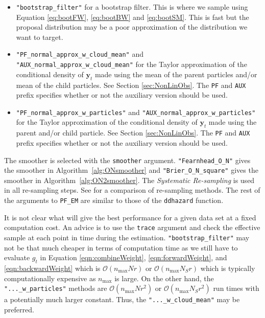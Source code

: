 \documentclass[notitlepage]{article}
\renewcommand{\vec}[1]{\bm{#1}}
\newcommand{\Lparen}[1]{\left( #1\right)}
\newcommand{\bigO}[1]{\mathcal{O}\Lparen{#1}}
\newcommand{\dimRng}{r}
\newcommand{\nPart}{N}
\newcommand{\nMax}{n_{\text{max}}}
\begin{document}
\begin{itemize}
	\item \texttt{"bootstrap\_filter"} for a bootstrap filter. This is where we sample using 
	Equation \eqref{eq:bootFW}, \eqref{eq:bootBW} and \eqref{eq:bootSM}. This is fast but the proposal 
	distribution may be a poor approximation of the distribution we want to target.
	\item \texttt{"PF\_normal\_approx\_w\_cloud\_mean"} and \texttt{"AUX\_normal\_approx\_w\_cloud\_mean"} for 
	the Taylor approximation of the conditional density of $\vec{y}_t$ made using the mean of the parent 
	particles and/or mean of the child particles. See Section \ref{sec:NonLinObs}. 
	The \texttt{PF} and \texttt{AUX} prefix specifies whether or not the auxiliary version 
	should be used.
	\item \texttt{"PF\_normal\_approx\_w\_particles"} and 
	 \texttt{"AUX\_normal\_approx\_w\_particles"} for the Taylor approximation of the conditional density 
	 of $\vec{y}_t$ made using the parent and/or child particle. 
	  See Section \ref{sec:NonLinObs}.
	  The \texttt{PF} and \texttt{AUX} prefix specifies whether or not the auxiliary version should be used.
\end{itemize}

The smoother is selected with the \texttt{smoother} argument. \texttt{"Fearnhead\_O\_N"} gives the smoother in Algorithm~\ref{alg:ONsmoother} and \texttt{"Brier\_O\_N\_square"} gives the smoother in Algorithm~\ref{alg:ON2smoother}. 
The \emph{Systematic Re-sampling} \citep{kitagawa96} is used in all re-sampling steps. See \cite{douc05} for a 
comparison of re-sampling methods. The rest of the arguments to \texttt{PF\_EM} are similar to those of the 
\texttt{ddhazard} function.

It is not clear what will give the best performance for a given data set
at a fixed computation cost. An advice is to use the \texttt{trace}
argument and check the effective sample at each point in time during the estimation. \texttt{"bootstrap\_filter"}
may not be that much cheaper in terms of computation time as we still have to evaluate $g_t$ in Equation
\eqref{eqn:combineWeight}, \eqref{eqn:forwardWeight}, and \eqref{eqn:backwardWeight} which is 
$\bigO{\nMax\nPart\dimRng}$ or $\bigO{\nMax\nPart_S\dimRng}$ 
which is typically computationally expensive as $\nMax$ is large. 
On the other hand, the \texttt{"...\_w\_particles"}
methods are $\bigO{\nMax\nPart\dimRng^2}$ or $\bigO{\nMax\nPart_S\dimRng^2}$ run times
with a potentially much larger constant. 
Thus, the \texttt{"...\_w\_cloud\_mean"} may be preferred.
\end{document}
